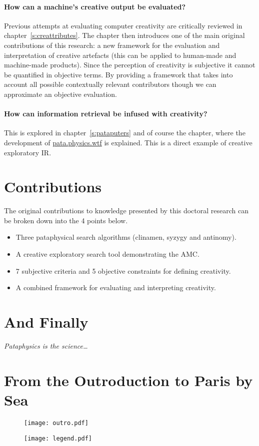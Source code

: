 \paragraph{How can a machine's creative output be evaluated?}

Previous attempts at evaluating computer creativity are critically reviewed in chapter~\ref{s:creattributes}. The  chapter then introduces one of the main original contributions of this research: a new framework for the evaluation and interpretation of creative artefacts (this can be applied to human-made and machine-made products). Since the perception of creativity is subjective it cannot be quantified in objective terms. By providing a framework that takes into account all possible contextually relevant contributors though we can approximate an objective evaluation.

\paragraph{How can information retrieval be infused with creativity?}

This is explored in chapter~\ref{s:pataputers} and of course the  chapter, where the development of \url{pata.physics.wtf} is explained. This is a direct example of creative exploratory \ac{IR}.


\section{Contributions}

The original contributions to knowledge presented by this doctoral research can be broken down into the 4 points below.

\begin{itemize}
  \item Three pataphysical search algorithms (clinamen, syzygy and antinomy).
  \item A creative exploratory search tool demonstrating the \ac{AMC}.
  \item 7 subjective criteria and 5 objective constraints for defining creativity.
  \item A combined framework for evaluating and interpreting creativity.
\end{itemize}


\section{And Finally}

\emph{Pataphysics is the science\ldots}


\section{From the Outroduction to Paris by Sea}

\begin{figure}[!htb]
\centering
  \texttt{[image: outro.pdf]}
\end{figure}



\begin{figure}[!htb]
\centering
  \texttt{[image: legend.pdf]}
\end{figure}

\stopcontents[chapters]
